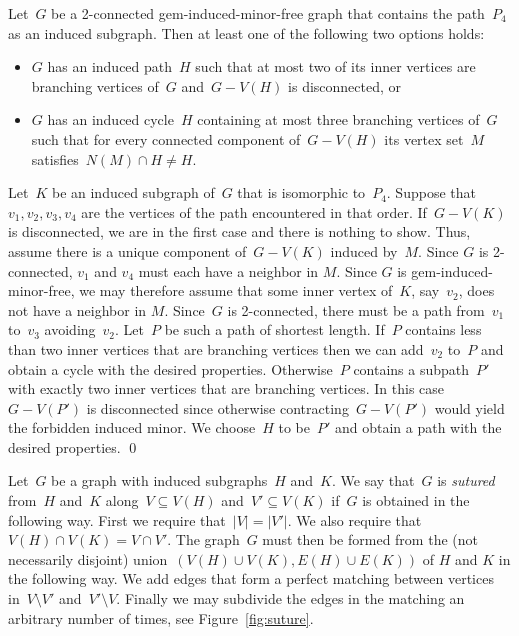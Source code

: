 \documentclass[envcountsame,envcountsect,11pt,a4paper]{llncs}
\renewenvironment{proof}{\begin{Proof}}{\qed\end{Proof}}
\begin{document}
\begin{lemma}
\label{lem:P4:or:cycle}
Let~$G$ be a 2-connected gem-induced-minor-free graph that contains the path~$P_4$ as an induced subgraph. Then at least one of the following two options holds:
\begin{itemize}
\item $G$ has an induced path~$H$ such that at most two of its inner vertices are branching vertices of~$G$ and~$G-V(H)$ is disconnected, or 
\item $G$ has an induced cycle~$H$ containing at most three branching vertices of~$G$ such that for every connected component of~$G-V(H)$ its vertex set~$M$ satisfies~$N(M)\cap H \neq H$.
\end{itemize}
\end{lemma}
\begin{proof}
Let~$K$ be an induced subgraph of~$G$ that is isomorphic to~$P_4$. Suppose that~$v_1,v_2,v_3,v_4$ are the vertices of the path encountered in that order.
If~$G-V(K)$ is disconnected, we are in the first case and there is nothing to show.
Thus, assume there is a unique component of~$G-V(K)$ induced by~$M$.
Since $G$ is 2-connected, $v_1$ and $v_4$ must each have a neighbor in $M$.
Since $G$ is gem-induced-minor-free, we may therefore assume that some inner vertex of~$K$, say~$v_2$, does not have a neighbor in $M$.
Since~$G$ is 2-connected, there must be a path from~$v_1$ to~$v_3$ avoiding~$v_2$. Let~$P$ be such a path of shortest length. If~$P$
contains less than two inner vertices that are branching vertices then we can add~$v_2$ to~$P$ and obtain a cycle with the desired properties.
Otherwise~$P$ contains a subpath~$P'$ with exactly two inner vertices that are branching vertices.
In this case~$G-V(P')$ is disconnected since otherwise contracting~$G-V(P')$ would yield the forbidden
induced minor. We choose~$H$ to be~$P'$ and obtain a path with the desired properties.
\end{proof}


Let~$G$ be a graph with induced subgraphs~$H$ and~$K$. We say that~$G$ is \emph{sutured} from~$H$ and~$K$ along~$V \subseteq V(H)$ and~$V'\subseteq V(K)$ if~$G$ is obtained in the following way. First we require that~$|V| = |V'|$.
We also require that~$V(H) \cap V(K) = V\cap V'$.
The graph~$G$ must then be formed from the (not necessarily disjoint) union~$(V(H) \cup V(K), E(H) \cup E(K))$ of $H$ and $K$ in the following way.
We add edges that form a perfect matching between vertices in~$V \setminus V'$ and~$V'\setminus V$. Finally we may subdivide the edges in
the matching an arbitrary number of times, see Figure~\ref{fig:suture}.
\end{document}
